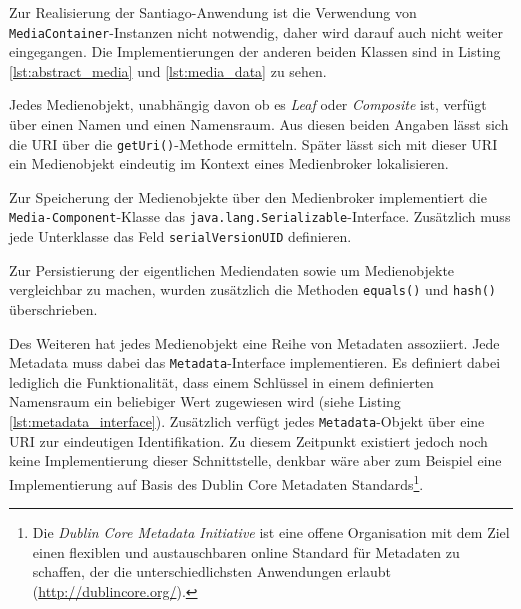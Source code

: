   Zur Realisierung der Santiago-Anwendung ist die Verwendung von \verb!MediaContainer!-Instan\-zen nicht notwendig, daher wird darauf auch nicht weiter eingegangen. Die Implementierungen der anderen beiden Klassen sind in Listing \ref{lst:abstract_media} und \ref{lst:media_data} zu sehen.

  

  
  
  Jedes Medienobjekt, unabhängig davon ob es \emph{Leaf} oder \emph{Composite} ist, verfügt über einen Namen und einen Namensraum. Aus diesen beiden Angaben lässt sich die URI über die \verb!getUri()!-Methode ermitteln. Später lässt sich mit dieser URI ein Medienobjekt eindeutig im Kontext eines Medienbroker lokalisieren.
  
  Zur Speicherung der Medienobjekte über den Medienbroker implementiert die \verb!Media-Component!-Klasse das \verb!java.lang.Serializable!-Interface. Zusätzlich muss jede Unterklasse das Feld \verb!serialVersionUID! definieren.
  
  Zur Persistierung der eigentlichen Mediendaten sowie um Medienobjekte vergleichbar zu machen, wurden zusätzlich die Methoden \verb!equals()! und \verb!hash()! überschrieben.
  
  Des Weiteren hat jedes Medienobjekt eine Reihe von Metadaten assoziiert. Jede Metadata muss dabei das \verb!Metadata!-Interface implementieren. Es definiert dabei lediglich die Funktionalität, dass einem Schlüssel in einem definierten Namensraum ein beliebiger Wert zugewiesen wird (siehe Listing \ref{lst:metadata_interface}). Zusätzlich verfügt jedes \verb!Metadata!-Objekt über eine URI zur eindeutigen Identifikation. Zu diesem Zeitpunkt existiert jedoch noch keine Implementierung dieser Schnittstelle, denkbar wäre aber zum Beispiel eine Implementierung auf Basis des Dublin Core Metadaten Standards\footnote{Die \emph{Dublin Core Metadata Initiative} ist eine offene Organisation mit dem Ziel einen flexiblen und austauschbaren online Standard für Metadaten zu schaffen, der die unterschiedlichsten Anwendungen erlaubt (\url{http://dublincore.org/}).}.
  
